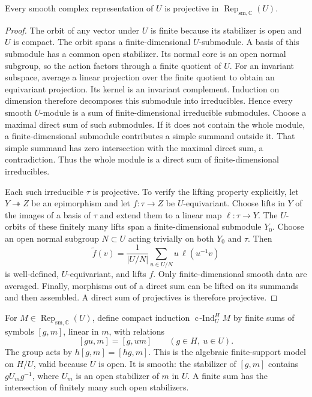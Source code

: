 \begin{lemma}\label{v4-arith:w10-d:fixed-center:lem:compact}
Every smooth complex representation of $U$ is projective in
$\operatorname{Rep}_{\mathrm{sm},\mathbb C}(U)$.
\end{lemma}
\begin{proof}
The orbit of any vector under $U$ is finite because its stabilizer is open and $U$ is compact.
The orbit spans a finite-dimensional $U$-submodule.
A basis of this submodule has a common open stabilizer.
Its normal core is an open normal subgroup, so the action factors through a finite quotient of $U$.
For an invariant subspace, average a linear projection over the finite quotient to obtain an equivariant projection.
Its kernel is an invariant complement.
Induction on dimension therefore decomposes this submodule into irreducibles.
Hence every smooth $U$-module is a sum of finite-dimensional irreducible submodules.
Choose a maximal direct sum of such submodules.
If it does not contain the whole module, a finite-dimensional submodule contributes a simple summand outside it.
That simple summand has zero intersection with the maximal direct sum, a contradiction.
Thus the whole module is a direct sum of finite-dimensional irreducibles.

Each such irreducible $\tau$ is projective.
To verify the lifting property explicitly, let $Y\twoheadrightarrow Z$ be an epimorphism and let $f:\tau\to Z$ be $U$-equivariant.
Choose lifts in $Y$ of the images of a basis of $\tau$ and extend them to a linear map $\ell:\tau\to Y$.
The $U$-orbits of these finitely many lifts span a finite-dimensional submodule $Y_0$.
Choose an open normal subgroup $N\subset U$ acting trivially on both $Y_0$ and $\tau$.
Then
\[
 \widetilde f(v)=\frac1{|U/N|}\sum_{u\in U/N}u\,\ell(u^{-1}v)
\]
is well-defined, $U$-equivariant, and lifts $f$.
Only finite-dimensional smooth data are averaged.
Finally, morphisms out of a direct sum can be lifted on its summands and then assembled.
A direct sum of projectives is therefore projective.
\end{proof}

For $M\in\operatorname{Rep}_{\mathrm{sm},\mathbb C}(U)$, define compact induction
$\operatorname{c\!\operatorname{-}Ind}_U^H M$ by finite sums of symbols $[g,m]$, linear in $m$, with relations
\[
 [gu,m]=[g,um]\qquad(g\in H,\ u\in U).
\]
The group acts by $h[g,m]=[hg,m]$.
This is the algebraic finite-support model on $H/U$, valid because $U$ is open.
It is smooth: the stabilizer of $[g,m]$ contains $gU_mg^{-1}$, where $U_m$ is an open stabilizer of $m$ in $U$.
A finite sum has the intersection of finitely many such open stabilizers.

